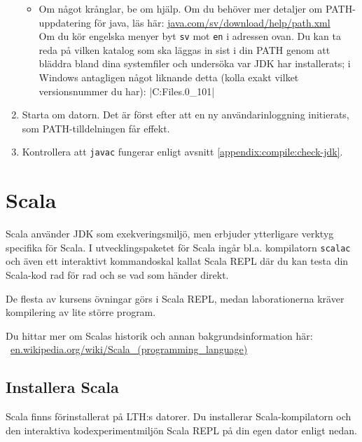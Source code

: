 \begin{enumerate}
\begin{itemize}
\item Om något krånglar, be om hjälp. Om du behöver mer detaljer om PATH-uppdatering för java, läs här:  \href{https://java.com/sv/download/help/path.xml}{java.com/sv/download/help/path.xml} \\
Om du kör engelska menyer byt \texttt{sv} mot \texttt{en} i adressen ovan.  Du kan ta reda på vilken katalog som ska läggas in sist i din PATH genom att bläddra bland dina systemfiler och undersöka var JDK har installerats; i Windows antagligen något liknande detta (kolla exakt vilket versionsnummer du har): \code|C:\Program Files\Java{}.0_101\bin|
\end{itemize}

\item Starta om datorn. Det är först efter att en ny användarinloggning initierats, som PATH-tilldelningen får effekt.

\item Kontrollera att \texttt{javac} fungerar enligt avsnitt \ref{appendix:compile:check-jdk}.
\end{enumerate}


\section{Scala}

Scala använder JDK som exekveringsmiljö, men erbjuder ytterligare verktyg specifika för Scala. I utvecklingspaketet för Scala ingår bl.a. kompilatorn \texttt{scalac} och även ett interaktivt kommandoskal kallat Scala REPL där du kan testa din Scala-kod rad för rad och se vad som händer direkt. 

De flesta av kursens övningar görs i Scala REPL, medan laborationerna kräver kompilering av lite större program.

Du hittar mer om Scalas historik och annan bakgrundsinformation här:\\\mbox{%
 \href{https://en.wikipedia.org/wiki/Scala_(programming_language)}{en.wikipedia.org/wiki/Scala\_(programming\_language)}
}

\subsection{Installera Scala }

Scala finns förinstallerat på LTH:s datorer. Du installerar Scala-kompilatorn och den interaktiva kodexperimentmiljön Scala REPL på din egen dator enligt nedan. 

